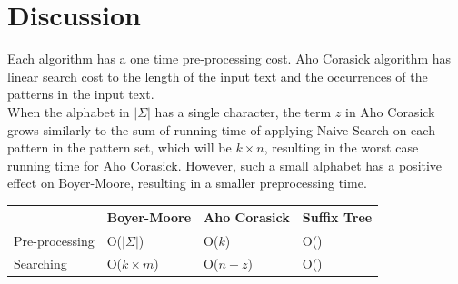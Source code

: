 \documentclass[paper=a4, fontsize=11pt]{scrartcl} %
\numberwithin{equation}{section} %
\numberwithin{figure}{section} %
\numberwithin{table}{section} %
\begin{document}
\newpage
\section{Discussion}
Each algorithm has a one time pre-processing cost. Aho Corasick algorithm has linear search cost to the length of the input text and the occurrences of the patterns in the input text. \\
When the alphabet in $|\Sigma|$ has a single character, the term $z$ in Aho Corasick grows similarly to the sum of running time of applying Naive Search on each pattern in the pattern set, which will be $k\times n$, resulting in the worst case running time for Aho Corasick. However, such a small alphabet has a positive effect on Boyer-Moore, resulting in a smaller preprocessing time.

\begin{center}
	\begin{tabular}{| l | l | l | l |}
		\hline
		& Boyer-Moore & Aho Corasick & Suffix Tree \\
		\hline
		Pre-processing & O($|\Sigma|$) & O($k$) & O() \\
		\hline
		Searching & O($k\times m$) & O($n + z$) & O() \\
		\hline
	\end{tabular}
\end{center}

\newpage

\nocite{*}
\end{document}
